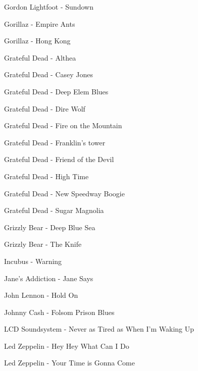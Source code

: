 Gordon Lightfoot - Sundown \dotfill \pageref{Sundown - Gordon Lightfoot} 

Gorillaz - Empire Ants \dotfill \pageref{Empire Ants - Gorillaz} 

Gorillaz - Hong Kong \dotfill \pageref{Hong Kong - Gorillaz} 

Grateful Dead - Althea \dotfill \pageref{Althea - Grateful Dead} 

Grateful Dead - Casey Jones \dotfill \pageref{Casey Jones - Grateful Dead} 

Grateful Dead - Deep Elem Blues \dotfill \pageref{Deep Elem Blues - Grateful Dead} 

Grateful Dead - Dire Wolf \dotfill \pageref{Dire Wolf - Grateful Dead} 

Grateful Dead - Fire on the Mountain \dotfill \pageref{Fire on the Mountain - Grateful Dead} 

Grateful Dead - Franklin's tower \dotfill \pageref{Franklin's tower - Grateful Dead} 

Grateful Dead - Friend of the Devil \dotfill \pageref{Friend of the Devil - Grateful Dead} 

Grateful Dead - High Time \dotfill \pageref{High Time - Grateful Dead} 

Grateful Dead - New Speedway Boogie \dotfill \pageref{New Speedway Boogie - Grateful Dead} 

Grateful Dead - Sugar Magnolia \dotfill \pageref{Sugar Magnolia - Grateful Dead} 

Grizzly Bear - Deep Blue Sea \dotfill \pageref{Deep Blue Sea - Grizzly Bear} 

Grizzly Bear - The Knife \dotfill \pageref{The Knife - Grizzly Bear} 

Incubus - Warning \dotfill \pageref{Warning - Incubus} 

Jane's Addiction - Jane Says \dotfill \pageref{Jane Says - Jane's Addiction} 

John Lennon - Hold On \dotfill \pageref{Hold On - John Lennon} 

Johnny Cash - Folsom Prison Blues \dotfill \pageref{Folsom Prison Blues - Johnny Cash} 

LCD Soundsystem - Never as Tired as When I'm Waking Up \dotfill \pageref{Never as Tired as When I'm Waking Up - LCD Soundsystem} 

Led Zeppelin - Hey Hey What Can I Do \dotfill \pageref{Hey Hey What Can I Do - Led Zeppelin} 

Led Zeppelin - Your Time is Gonna Come \dotfill \pageref{Your Time is Gonna Come - Led Zeppelin} 

